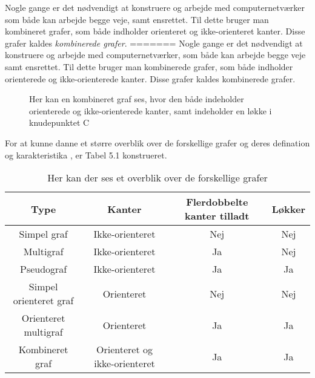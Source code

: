 \noindent Nogle gange er det nødvendigt at konstruere og arbejde med computernetværker som både kan arbejde begge veje, samt ensrettet. Til dette bruger man kombineret grafer, som både indholder orienteret og ikke-orienteret kanter. Disse grafer kaldes \textit{kombinerede grafer}.
=======
\noindent Nogle gange er det nødvendigt at konstruere og arbejde med computernetværker, som både kan arbejde begge veje samt ensrettet. Til dette bruger man kombinerede grafer, som både indholder orienterede og ikke-orienterede kanter. Disse grafer kaldes kombinerede grafer.


\begin{figure}[!h]
\centering
{}
\caption{Her kan en kombineret graf ses, hvor den både indeholder orienterede og ikke-orienterede kanter, samt indeholder en løkke i knudepunktet C}
\end{figure}

\noindent For at kunne danne et større overblik over de forskellige grafer og deres defination og karakteristika , er Tabel 5.1 konstrueret.

\begin{table}[h]
\begin{tabular}{|c|c|c|c|}
\hline 
Type & Kanter & Flerdobbelte kanter tilladt & Løkker \\ 
\hline
Simpel graf & Ikke-orienteret & Nej & Nej	 \\ 

Multigraf & Ikke-orienteret & Ja & Nej \\ 

Pseudograf & Ikke-orienteret & Ja & Ja \\ 
 
Simpel orienteret graf & Orienteret & Nej & Nej \\ 
 
Orienteret multigraf & Orienteret & Ja & Ja \\ 
 
Kombineret graf & Orienteret og ikke-orienteret & Ja & Ja \\ 
\hline 
\end{tabular}
\caption{Her kan der ses et overblik over de forskellige grafer} \label{table:graf_oversigt}
\end{table}


